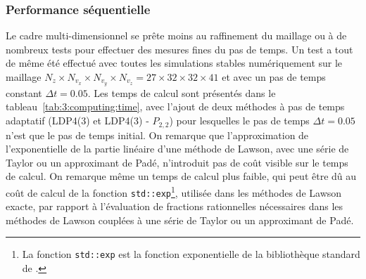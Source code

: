 \subsubsection{Performance séquentielle}

Le cadre multi-dimensionnel se prête moins au raffinement du maillage ou à de nombreux tests pour effectuer des mesures fines du pas de temps. Un test a tout de même été effectué avec toutes les simulations stables numériquement sur le maillage $N_z \times N_{v_x} \times N_{v_y} \times N_{v_z}=27\times32\times32\times41$ et avec un pas de temps constant $\Delta t=0.05$. Les temps de calcul sont présentés dans le tableau~\ref{tab:3:computing:time}, avec l'ajout de deux méthodes à pas de temps adaptatif (LDP4(3) et LDP4(3) - $P_{2,2}$) pour lesquelles le pas de temps $\Delta t=0.05$ n'est que le pas de temps initial. On remarque que l'approximation de l'exponentielle de la partie linéaire d'une méthode de Lawson, avec une série de Taylor ou un approximant de Padé, n'introduit pas de coût visible sur le temps de calcul. On remarque même un temps de calcul plus faible, qui peut être dû au coût de calcul de la fonction \texttt{std::exp}\footnote{La fonction \CC{} \texttt{std::exp} est la fonction exponentielle de la bibliothèque standard de \CC{}.}, utilisée dans les méthodes de Lawson exacte, par rapport à l'évaluation de fractions rationnelles nécessaires dans les méthodes de Lawson couplées à une série de Taylor ou un approximant de Padé.

